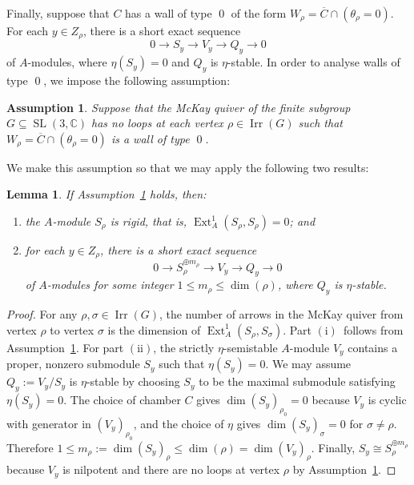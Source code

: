 \documentclass[11pt,reqno]{amsart}
\numberwithin{equation}{section}
\newtheorem{lemma}[theorem]{Lemma}
\newtheorem{assumption}[theorem]{Assumption}
\theoremstyle{definition}
\newcommand{\one}{\ensuremath{(\mathrm{i})}}
\newcommand{\two}{\ensuremath{(\mathrm{ii})}}
\newcommand{\CC}{\ensuremath{\mathbb{C}}}
\newcommand{\Ext}{\operatorname{Ext}}
\newcommand{\0}{\operatorname{0}}
\newcommand{\Irr}{\operatorname{Irr}}
\newcommand{\SL}{\operatorname{SL}}
\begin{document}
Finally, suppose that $C$ has a wall of type $\0$ of the form $W_\rho=\overline{C}\cap (\theta_\rho=0)$. For each $y\in Z_\rho$, there is a short exact sequence 
 \[
 0\longrightarrow S_y\longrightarrow V_y\longrightarrow Q_y\longrightarrow 0
 \]
 of $A$-modules, where $\eta(S_y)=0$ and $Q_y$ is $\eta$-stable. In order to analyse walls of type $\0$, we impose the following assumption:

   \begin{assumption}
   \label{ass:noloops} 
Suppose that the McKay quiver of the finite subgroup $G\subseteq \SL(3,\CC)$ has no loops at each vertex $\rho\in \Irr(G)$ such that $W_\rho=\overline{C}\cap (\theta_\rho=0)$ is a wall of type $\0$.
   \end{assumption}

 We make this assumption so that we may apply the following two results:
  
 \begin{lemma}
 \label{lem:AssumptionsImply}
If Assumption~\ref{ass:noloops} holds, then:
\begin{enumerate}
    \item[\one] the $A$-module $S_\rho$ is rigid, that is, $\Ext^1_A(S_\rho,S_\rho)=0$; and
    \item[\two] for each $y\in Z_\rho$, there is a short exact sequence 
 \begin{equation}
 \label{eqn:destabilise}
 0\longrightarrow S_\rho^{\oplus m_\rho}\longrightarrow V_y\longrightarrow Q_y\longrightarrow 0
 \end{equation}
 of $A$-modules for some integer $1\leq m_\rho\leq \dim(\rho)$, where $Q_y$ is $\eta$-stable.
\end{enumerate}
  \end{lemma}
 \begin{proof}
  For any $\rho,\sigma\in \Irr(G)$, the number of arrows in the McKay quiver from vertex $\rho$ to vertex $\sigma$ is the dimension of $\Ext_A^1(S_\rho,S_\sigma)$. Part \one\ follows from Assumption~\ref{ass:noloops}. For part \two, the strictly $\eta$-semistable $A$-module $V_y$ contains a proper, nonzero submodule $S_y$ such that $\eta(S_y)=0$. We may assume $Q_y:=V_y/S_y$ is $\eta$-stable by choosing $S_y$ to be the maximal submodule satisfying $\eta(S_y)=0$. The choice of chamber $C$ gives $\dim (S_y)_{\rho_0}=0$ because $V_y$ is cyclic with generator in $(V_y)_{\rho_0}$, and the choice of $\eta$ gives $\dim (S_y)_\sigma=0$ for $\sigma\neq \rho$. Therefore $1\leq m_\rho:=\dim (S_y)_\rho \leq \dim(\rho)=\dim (V_y)_\rho$. 
 Finally,  $S_y\cong S_\rho^{\oplus m_\rho}$ because $V_y$ is nilpotent and there are no loops at vertex $\rho$ by Assumption~\ref{ass:noloops}. 
  \end{proof}
\end{document}
